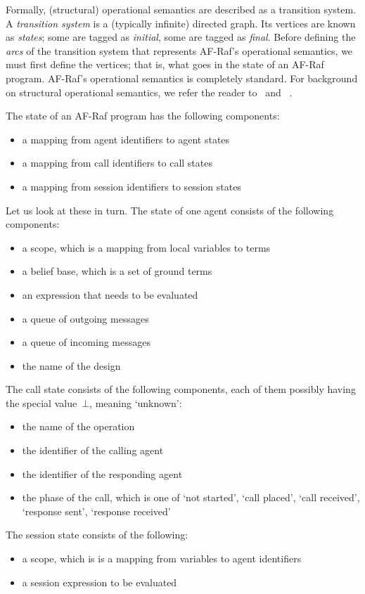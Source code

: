 \documentclass[a4paper,12pt,oneside,fleqn]{book} %
\begin{document}
{Formally, (structural) operational semantics are described as a transition
system. A \emph{transition system} is a (typically infinite) directed
graph. Its vertices are known as \emph{states}; some are tagged as
\emph{initial}, some are tagged as \emph{final}. Before defining the
\emph{arcs} of the transition system that represents AF-Raf's operational
semantics, we must first define the vertices; that is, what goes in the
state of an AF-Raf program. AF-Raf's operational semantics is completely
standard. For background on structural operational
semantics, we refer the reader to~\cite[Section~5.2]{harper2012} and
~\cite{plotkin1981structural}.

The state of an AF-Raf program has the following components:
\begin{itemize}
\item a mapping from agent identifiers to agent states
\item a mapping from call identifiers to call states
\item a mapping from session identifiers to session states
\end{itemize}
Let us look at these in turn. The state of one agent consists of the
following components:
\begin{itemize}
\item a scope, which is a mapping from local variables to terms
\item a belief base, which is a set of ground terms
\item an expression that needs to be evaluated
\item a queue of outgoing messages
\item a queue of incoming messages
\item the name of the design
\end{itemize}
The call state consists of the following components, each of them possibly
having the special value~$\bot$, meaning `unknown':
\begin{itemize}
\item the name of the operation
\item the identifier of the calling agent
\item the identifier of the responding agent
\item the phase of the call, which is one of `not started', `call placed',
`call received', `response sent', `response received'
\end{itemize}
The session state consists of the following:
\begin{itemize}
\item a scope, which is is a mapping from variables to agent identifiers
\item a session expression to be evaluated
\end{itemize}

}
\end{document}
